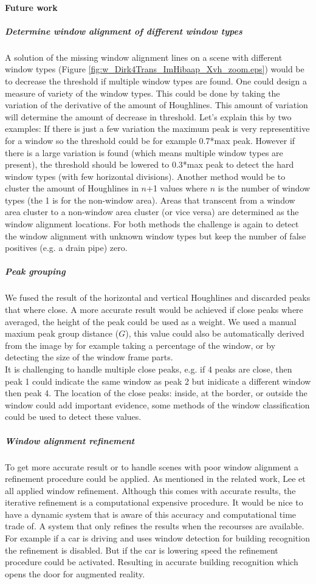 \paragraph{Future work}
\subparagraph{Determine window alignment of different window types}
A solution of the missing window alignment lines on a scene with different
window types (Figure \ref{fig:w_Dirk4Trans_ImHibaap_Xvh_zoom.eps}) would be to
decrease the threshold if multiple window types are found. One could design a
measure of variety of the window types. This could be done by taking the variation of the
derivative of the amount of Houghlines. This amount of variation will determine
the amount of decrease in threshold. Let's explain this by two examples:
If there is just a few variation the maximum peak is very representitive for a
window so the threshold could be for example 0.7*max peak. However if there is a
large variation is found (which means multiple window types are present), the
threshold should be lowered to 0.3*max peak to detect the hard window types
(with few horizontal divisions).
Another method would be to cluster the amount of Houghlines in $n$+1 values
where $n$ is the number of window types (the 1 is for the non-window area).
Areas that transcent from a window area cluster to a non-window area cluster
(or vice versa) are determined as the window alignment locations.
For both methods the challenge is again to detect the window alignment with
unknown window types but keep the number of false positives (e.g. a drain pipe)
zero.

\subparagraph{Peak grouping}
We fused the result of the horizontal and vertical Houghlines and discarded
peaks that where close.  A more accurate result would be achieved if close peaks
where averaged, the height of the peak could be used as a weight.  We used a
manual maxium peak group distance ($G$), this value could also be automatically
derived from the image by for example taking a percentage of the window, or by
detecting the size of the window frame parts.\\ It is challenging to handle
multiple close peaks, e.g. if 4 peaks are close, then peak 1 could indicate the
same window as peak 2 but inidicate a different window then peak 4. The location
of the close peaks: inside, at the border, or outside the window could add
important evidence, some methods of the window classification could be used to
detect these values.

\subparagraph{Window alignment refinement}
To get more accurate result or to handle scenes with poor window alignment a
refinement procedure could be applied.  As mentioned in the related work, Lee et
all \cite{Lee_extraction} applied window refinement.  Although this comes with
accurate results, the iterative refinement is a computational expensive
procedure.  It would be nice to have a dynamic system that is aware of this
accuracy and computational time trade of. A system that only refines the results
when the recourses are available.  For example if a car is driving and uses
window detection for building recognition the refinement is disabled.  But if
the car is lowering speed the refinement procedure could be activated.
Resulting in accurate building recognition which opens the door for augmented
reality.\\

